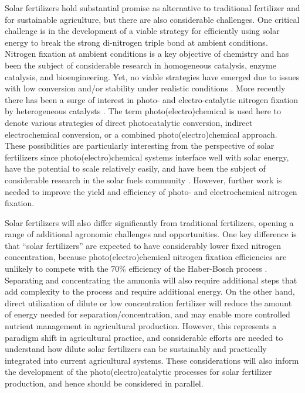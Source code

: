 Solar fertilizers hold substantial promise as alternative to traditional fertilizer and for sustainable agriculture, but there are also considerable challenges. One critical challenge is in the development of a viable strategy for efficiently using solar energy to break the strong di-nitrogen triple bond at ambient conditions. Nitrogen fixation at ambient conditions is a key objective of chemistry and has been the subject of considerable research in homogeneous catalysis, enzyme catalysis, and bioengineering. Yet, no viable strategies have emerged due to issues with low conversion and/or stability under realistic conditions \cite{Vicente_2017,Bur_n_2017,MacLeod_2013,Foster2018}.
More recently there has been a surge of interest in photo- and electro-catalytic nitrogen fixation by heterogeneous catalysts \cite{Medford_2017,Kyriakou_2017,Foster_2018,Chen_2018}. The term photo(electro)chemical is used here to denote various strategies of direct photocatalytic conversion, indirect electrochemical conversion, or a combined photo(electro)chemical approach. These possibilities are particularly interesting from the perspective of solar fertilizers since photo(electro)chemical systems interface well with solar energy, have the potential to scale relatively easily, and have been the subject of considerable research in the solar fuels community \cite{walter_2010, Pinaud_2013,Kondratenko2013,Shaner_2016, Lewis_2016, Montoya_2017}. However, further work is needed to improve the yield and efficiency of photo- and electrochemical nitrogen fixation. %

Solar fertilizers will also differ significantly from traditional fertilizers, opening a range of additional agronomic challenges and opportunities. One key difference is that ``solar fertilizers'' are expected to have considerably lower fixed nitrogen concentration, because photo(electro)chemical nitrogen fixation efficiencies are unlikely to compete with the 70\% efficiency of the Haber-Bosch process \cite{Schloegl_2003, Singh_2017}.
Separating and concentrating the ammonia will also require additional steps that add complexity to the process and require additional energy. On the other hand, direct utilization of dilute or low concentration fertilizer will reduce the amount of energy needed for separation/concentration, and may enable more controlled nutrient management in agricultural production\cite{Bar_Yosef_1999,kafkafi2011fertigation}. However, this represents a paradigm shift in agricultural practice, and considerable efforts are needed to understand how dilute solar fertilizers can be sustainably and practically integrated into current agricultural systems. These considerations will also inform the development of the photo(electro)catalytic processes for solar fertilizer production, and hence should be considered in parallel.

